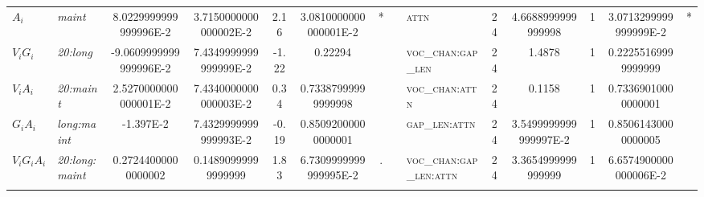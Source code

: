 \begin{table}
\begin{tabular}{ l >{\itshape}l S S S S[round-precision=3,round-minimum=0.001,table-format=>1.3] c c >{\scshape}l c S c S[round-precision=3,round-minimum=0.001,table-format=>1.3] c@{} }
	$A_i$             & maint                 & 8.0229999999999996E-2   & 3.7150000000000002E-2  & 2.16                         & 3.0810000000000001E-2   & *       & & attn                                           & 24                  & 4.6688999999999998                                & 1                  & 3.0713299999999999E-2                             & *                    \\ 
	$V_i G_i$         & 20:long               & -9.0609999999999996E-2  & 7.4349999999999999E-2  & -1.22                        & 0.22294                 &         & & voc\_chan:gap\_len                             & 24                  & 1.4878                                            & 1                  & 0.22255169999999999                               &                      \\ 
	$V_i A_i$         & 20:maint              & 2.5270000000000001E-2   & 7.4340000000000003E-2  & 0.34                         & 0.73387999999999998     &         & & voc\_chan:attn                                 & 24                  & 0.1158                                            & 1                  & 0.73369010000000001                               &                      \\ 
	$G_i A_i$         & long:maint            & -1.397E-2               & 7.4329999999999993E-2  & -0.19                        & 0.85092000000000001     &         & & gap\_len:attn                                  & 24                  & 3.5499999999999997E-2                             & 1                  & 0.85061430000000005                               &                      \\ 
	$V_i G_i A_i$     & 20:long:maint         & 0.27244000000000002     & 0.14890999999999999    & 1.83                         & 6.7309999999999995E-2   & .       & & voc\_chan:gap\_len:attn                        & 24                  & 3.3654999999999999                                & 1                  & 6.6574900000000006E-2                             &                      \\ \midrule
	 &                 &                        &                              &                         &         & &                                                &                     &                                                   &                    &                                                   &                      \\

\end{tabular}
\end{table}
